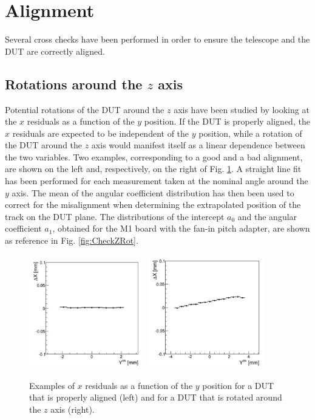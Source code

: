\section{Alignment}
\label{sec:Alignment}

Several cross checks have been performed in order to ensure the telescope and the DUT are correctly aligned.

\subsection{Rotations around the $z$ axis}

Potential rotations of the DUT around the $z$ axis have been studied by looking at the $x$ residuals as a function of the $y$ position. If the DUT is properly aligned, the $x$ residuals are expected to be independent of the $y$ position, while a rotation of the DUT around the $z$ axis would manifest itself as a linear dependence between the two variables.
Two examples, corresponding to a good and a bad alignment, are shown on the left and, respectively, on the right of Fig. \ref{fig:RotationZ}.
A straight line fit has been performed for each measurement taken at the nominal angle around the $y$ axis. The mean of the angular coefficient distribution has then  been used to correct for the misalignment when determining the extrapolated position of the track on the DUT plane. The distributions of the intercept $a_0$ and the angular coefficient $a_1$, obtained for the M1 board with the fan-in pitch adapter, are shown as reference in Fig. \ref{fig:CheckZRot}.

\begin{figure}[]
\centering
\includegraphics[width=0.45\textwidth]{figs/RotationZGood.png}
\includegraphics[width=0.45\textwidth]{figs/RotationZBad.png}
\caption[Examples of $x$ residuals as a function of the $y$ position.]{Examples of $x$ residuals as a function of the $y$ position for a DUT that is properly aligned (left) and for a DUT that is rotated around the $z$ axis (right).}
\label{fig:RotationZ}
\end{figure}

